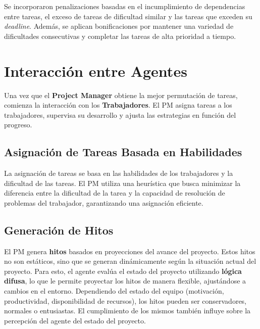 \documentclass[a4paper, 12pt]{article}
\begin{document}
Se incorporaron penalizaciones basadas en el incumplimiento de dependencias entre tareas, el exceso de tareas de dificultad similar y las tareas que exceden su \textit{deadline}. Además, se aplican bonificaciones por mantener una variedad de dificultades consecutivas y completar las tareas de alta prioridad a tiempo.

\section{Interacción entre Agentes}
Una vez que el \textbf{Project Manager} obtiene la mejor permutación de tareas, comienza la interacción con los \textbf{Trabajadores}. El PM asigna tareas a los trabajadores, supervisa su desarrollo y ajusta las estrategias en función del progreso.

\subsection{Asignación de Tareas Basada en Habilidades}
La asignación de tareas se basa en las habilidades de los trabajadores y la dificultad de las tareas. El PM utiliza una heurística que busca minimizar la diferencia entre la dificultad de la tarea y la capacidad de resolución de problemas del trabajador, garantizando una asignación eficiente.

\subsection{Generación de Hitos}
El PM genera \textbf{hitos} basados en proyecciones del avance del proyecto. Estos hitos no son estáticos, sino que se generan dinámicamente según la situación actual del proyecto. Para esto, el agente evalúa el estado del proyecto utilizando \textbf{lógica difusa}, lo que le permite proyectar los hitos de manera flexible, ajustándose a cambios en el entorno. Dependiendo del estado del equipo (motivación, productividad, disponibilidad de recursos), los hitos pueden ser conservadores, normales o entusiastas. El cumplimiento de los mismos también influye sobre la percepción del agente del estado del proyecto.
\end{document}
